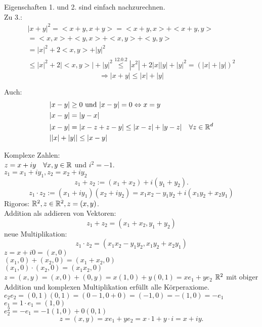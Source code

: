 \begin{bew}
	Eigenschaften 1. und 2. sind einfach nachzurechnen.\\
	Zu 3.:
	\begin{align*}
		|x+y|^2 = <x+y,x+y>=<x+y,x>+<x+y,y>\\
		= <x,x> + <y,x> + <x,y> + <y,y>\\
		=|x|^2 + 2<x,y> + |y|^2\\
		\leq |x|^2 + 2|<x,y>| + |y|^2 \overset{12.0.2}{\leq} |x^2| + 2|x||y| + |y|^2 = (|x|+|y|)^2
	\end{align*}
	\[ \Rightarrow |x+y| \leq |x| + |y| \]
\end{bew}
\begin{bem}
	Auch:
	\begin{align*}
		&|x - y| \geq 0 \text{ und } |x - y| = 0 \Leftrightarrow x = y\\
		&|x - y| = |y - x|\\
		&|x - y| = |x-z + z-y| \leq |x - z| + |y - z| \quad \forall z \in \mathbb{R}^d\\
		&||x| + |y|| \leq |x - y|
	\end{align*}
\end{bem}
Komplexe Zahlen:\\
\( z=x+iy \quad\forall x,y\in\mathbb{R} \) und \( i^2 = -1 \).\\
\( z_1 = x_1 + i y_1, z_2 = x_2 + i y_2 \)
\[ z_1 + z_2 := (x_1 + x_2) + i(y_1 + y_2). \]
\[ z_1 \cdot z_2 := (x_1 + i y_1)(x_2 + i y_2) = x_1x_2 - y_1y_2 + i(x_1y_2 + x_2y_1) \]
Rigoros: \( \mathbb{R}^2, z\in\mathbb{R}^2, z=(x,y) \).\\
Addition als addieren von Vektoren: \[ z_1 + z_2 = (x_1 + x_2, y_1 + y_2) \]
neue Multiplikation: \[ z_1 \cdot z_2 = (x_1 x_2 - y_1y_2, x_1y_2 + x_2y_1) \]
\( z = x+i 0 = (x,0) \)\\
\( (x_1,0) + (x_2,0) = (x_1+x_2,0) \)\\
\( (x_1,0)\cdot(x_2,0) = (x_1x_2,0) \)\\
\( z=(x,y) = (x,0) + (0,y) = x(1,0) + y(0,1) = x e_1 + y e_2 \)
\( \mathbb{R}^2 \) mit obiger Addition und \glqq komplexen \grqq{} Multiplikation erfüllt alle Körperaxiome.\\
\( e_2 e_2 = (0,1)(0,1) = (0-1,0 + 0) = (-1,0) = -(1,0) = -e_1 \)\\
\(e_1 = 1\cdot e_1 = (1,0) \)\\
\( e_2^2 = -e_1 = -1 (1,0) + 0(0,1) \)
\[ z = (x,y) = x e_1 + y e_2 = x \cdot 1 + y \cdot i = x + i y. \]
